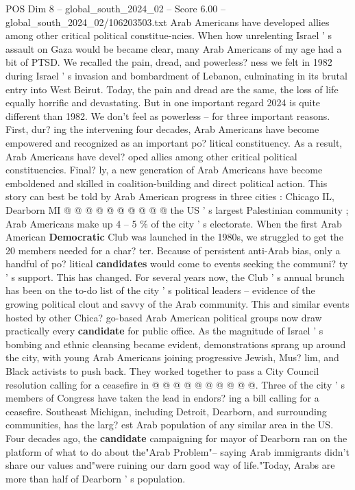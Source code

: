 \begin{textsample}{POS Dim 8 – global\_south\_2024\_02 – Score 6.00 – global\_south\_2024\_02/106203503.txt}  \label{ex:f8_pos_204}
Arab Americans have developed allies among other critical political constitue-ncies.
When how unrelenting Israel ' s assault on Gaza would be became clear, many Arab Americans of my age had a bit of PTSD.
We recalled the pain, dread, and powerless? ness we felt in 1982 during Israel ' s invasion and bombardment of Lebanon, culminating in its brutal entry into West Beirut.
Today, the pain and dread are the same, the loss of life equally horrific and devastating.
But in one important regard 2024 is quite different than 1982.
We don't feel as powerless -- for three important reasons.
First, dur? ing the intervening four decades, Arab Americans have become empowered and recognized as an important po? litical constituency.
As a result, Arab Americans have devel? oped allies among other critical political constituencies.
Final? ly, a new generation of Arab Americans have become emboldened and skilled in coalition-building and direct political action.
This story can best be told by Arab American progress in three cities : Chicago IL, Dearborn MI @ @ @ @ @ @ @ @ @ @ the US ' s largest Palestinian community ; Arab Americans make up 4 -- 5 \% of the city ' s electorate.
When the first Arab American \textbf{Democratic} Club was launched in the 1980s, we struggled to get the 20 members needed for a char? ter.
Because of persistent anti-Arab bias, only a handful of po? litical \textbf{candidates} would come to events seeking the communi? ty ' s support.
This has changed.
For several years now, the Club ' s annual brunch has been on the to-do list of the city ' s political leaders -- evidence of the growing political clout and savvy of the Arab community.
This and similar events hosted by other Chica? go-based Arab American political groups now draw practically every \textbf{candidate} for public office.
As the magnitude of Israel ' s bombing and ethnic cleansing became evident, demonstrations sprang up around the city, with young Arab Americans joining progressive Jewish, Mus? lim, and Black activists to push back.
They worked together to pass a City Council resolution calling for a ceasefire in @ @ @ @ @ @ @ @ @ @.
Three of the city ' s members of Congress have taken the lead in endors? ing a bill calling for a ceasefire.
Southeast Michigan, including Detroit, Dearborn, and surrounding communities, has the larg? est Arab population of any similar area in the US.
Four decades ago, the \textbf{candidate} campaigning for mayor of Dearborn ran on the platform of what to do about the"Arab Problem"-- saying Arab immigrants didn't share our values and"were ruining our darn good way of life."Today, Arabs are more than half of Dearborn ' s population.

\end{textsample}
